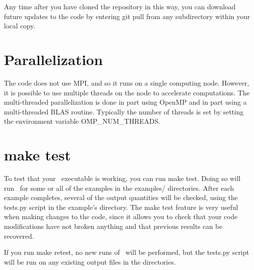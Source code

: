 Any time after you have cloned the repository in this way, you can download future updates to the code by entering {\ttfamily git pull} from any subdirectory within your local copy.



\section{Parallelization}

The code does not use {\ttfamily MPI}, and so it runs on a single computing node.  However, it is possible to use multiple threads
on the node to accelerate computations.  The multi-threaded parallelization is done in part using {\ttfamily OpenMP}
and in part using a multi-threaded {\ttfamily BLAS} routine. Typically the number of threads is set by
setting the environment variable {\ttfamily OMP\_NUM\_THREADS}.


\section{\ttfamily make test}

To test that your \regcoil~executable is working, you can run {\ttfamily make test}.  Doing so will run
\regcoil~for some or all of the examples in the {\ttfamily examples/} directories.
After each example completes, several of the output quantities
will be checked, using the
{\ttfamily tests.py} script in the example's directory.
The {\ttfamily make test} feature is very useful when making changes to the code, since it allows you to check
that your code modifications have not broken anything and that previous results
can be recovered.

If you run {\ttfamily make retest},
no new runs of \regcoil~will be performed, but the {\ttfamily tests.py} script
will be run on any existing output files in the  directories.


